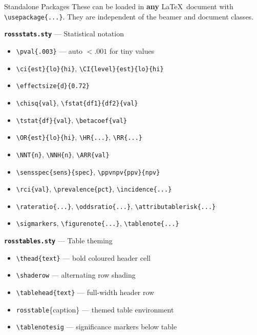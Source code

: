 \documentclass[palette=lancet]{rossbeamerscientific}
\newcommand{\cmd}[1]{\texttt{\color{rbAccent}\textbackslash #1}}
\newcommand{\env}[1]{\texttt{\color{rbSecondary}#1}}
\newcommand{\pkg}[1]{\texttt{\color{rbSecondary}\bfseries #1}}
\begin{document}
\begin{frame}{Standalone Packages}
\footnotesize
These can be loaded in \textbf{any} \LaTeX\ document with \texttt{\textbackslash usepackage\{...\}}.
They are independent of the beamer and document classes.
\vskip6pt
\begin{twocol}
  \textbf{\pkg{rossstats.sty}} --- Statistical notation
  \begin{itemize}\setlength\itemsep{0pt}
    \item \cmd{pval\{.003\}} --- auto $< .001$ for tiny values
    \item \cmd{ci\{est\}\{lo\}\{hi\}}, \cmd{CI\{level\}\{est\}\{lo\}\{hi\}}
    \item \cmd{effectsize\{d\}\{0.72\}}
    \item \cmd{chisq\{val\}}, \cmd{fstat\{df1\}\{df2\}\{val\}}
    \item \cmd{tstat\{df\}\{val\}}, \cmd{betacoef\{val\}}
    \item \cmd{OR\{est\}\{lo\}\{hi\}}, \cmd{HR\{...\}}, \cmd{RR\{...\}}
    \item \cmd{NNT\{n\}}, \cmd{NNH\{n\}}, \cmd{ARR\{val\}}
    \item \cmd{sensspec\{sens\}\{spec\}}, \cmd{ppvnpv\{ppv\}\{npv\}}
    \item \cmd{rci\{val\}}, \cmd{prevalence\{pct\}}, \cmd{incidence\{...\}}
    \item \cmd{rateratio\{...\}}, \cmd{oddsratio\{...\}}, \cmd{attributablerisk\{...\}}
    \item \cmd{sigmarkers}, \cmd{figurenote\{...\}}, \cmd{tablenote\{...\}}
  \end{itemize}
  \vskip6pt

  \textbf{\pkg{rosstables.sty}} --- Table theming
  \begin{itemize}\setlength\itemsep{0pt}
    \item \cmd{thead\{text\}} --- bold coloured header cell
    \item \cmd{shaderow} --- alternating row shading
    \item \cmd{tablehead\{text\}} --- full-width header row
    \item \env{rosstable}\{caption\} --- themed table environment
    \item \cmd{tablenotesig} --- significance markers below table
  \end{itemize}


\end{twocol}
\end{frame}
\end{document}

